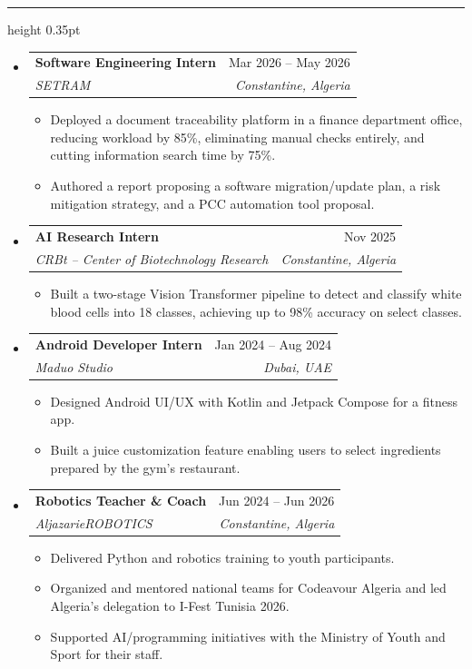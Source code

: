 \documentclass[10pt]{article}
\makeatletter
\newcommand{\resumesection}[1]{%
  \vspace{1.0ex}
  \noindent{\large\scshape #1}\par
  \vspace{0.5ex}
  \hrule height 0.35pt
  \vspace{1.0ex}
}
\newcommand{\resumeentry}[4]{%
  \item[]
  \begin{tabular*}{\textwidth}{@{\extracolsep{\fill}}p{0.78\textwidth}r}
    {\textbf{#1}} & {#2} \\
    {\textit{#3}} & {\textit{#4}} \\
  \end{tabular*}
  \vspace{-0.8ex}
}
\makeatother
\begin{document}
\resumesection{Experience}
\begin{itemize}
    \resumeentry{Software Engineering Intern}{Mar 2026 -- May 2026}{SETRAM}{Constantine, Algeria}
    \begin{itemize}[leftmargin=1.15em,label=\textbullet]
        \item Deployed a document traceability platform in a finance department office, reducing workload by 85\%, eliminating manual checks entirely, and cutting information search time by 75\%.
        \item Authored a report proposing a software migration/update plan, a risk mitigation strategy, and a PCC automation tool proposal.
    \end{itemize}

    \resumeentry{AI Research Intern}{Nov 2025}{CRBt -- Center of Biotechnology Research}{Constantine, Algeria}
    \begin{itemize}[leftmargin=1.15em,label=\textbullet]
        \item Built a two-stage Vision Transformer pipeline to detect and classify white blood cells into 18 classes, achieving up to 98\% accuracy on select classes.
    \end{itemize}

    \resumeentry{Android Developer Intern}{Jan 2024 -- Aug 2024}{Maduo Studio}{Dubai, UAE}
    \begin{itemize}[leftmargin=1.15em,label=\textbullet]
        \item Designed Android UI/UX with Kotlin and Jetpack Compose for a fitness app.
        \item Built a juice customization feature enabling users to select ingredients prepared by the gym’s restaurant.
    \end{itemize}

    \resumeentry{Robotics Teacher \& Coach}{Jun 2024 -- Jun 2026}{AljazarieROBOTICS}{Constantine, Algeria}
    \begin{itemize}[leftmargin=1.15em,label=\textbullet]
        \item Delivered Python and robotics training to youth participants.
        \item Organized and mentored national teams for Codeavour Algeria and led Algeria's delegation to I-Fest Tunisia 2026.
        \item Supported AI/programming initiatives with the Ministry of Youth and Sport for their staff.
    \end{itemize}


\end{itemize}
\end{document}
